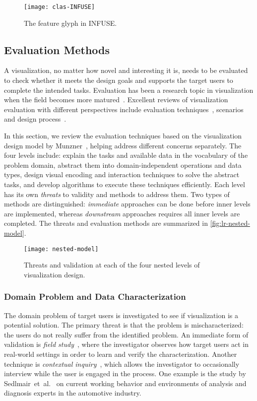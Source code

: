 \begin{figure}[!htb]
	\centering
	\texttt{[image: clas-INFUSE]}
	\caption{The feature glyph in INFUSE. }
	\label{fig:lr-INFUSE}
\end{figure}

\subsection{Evaluation Methods}
A visualization, no matter how novel and interesting it is, needs to be evaluated to check whether it meets the design goals and supports the target users to complete the intended tasks. Evaluation has been a research topic in visualization when the field becomes more matured~\cite{Plaisant2004}. Excellent reviews of visualization evaluation with different perspectives include evaluation techniques~\cite{Carpendale2008}, scenarios~\cite{Lam2012} and design process~\cite{Munroe2009}.

In this section, we review the evaluation techniques based on the visualization design model by Munzner~\cite{Munroe2009}, helping address different concerns separately. The four levels include: explain the tasks and available data in the vocabulary of the problem domain, abstract them into domain-independent operations and data types, design visual encoding and interaction techniques to solve the abstract tasks, and develop algorithms to execute these techniques efficiently. Each level has its own \emph{threats} to validity and methods to address them. Two types of methods are distinguished: \emph{immediate} approaches can be done before inner levels are implemented, whereas \emph{downstream} approaches requires all inner levels are completed. The threats and evaluation methods are summarized in \autoref{fig:lr-nested-model}.

\begin{figure}[!htb]
	\centering
	\texttt{[image: nested-model]}
	\caption{Threats and validation at each of the four nested levels of visualization design. }
	\label{fig:lr-nested-model}
\end{figure}

\subsubsection{Domain Problem and Data Characterization}
The domain problem of target users is investigated to see if visualization is a potential solution. The primary threat is that the problem is mischaracterized: the users do not really suffer from the identified problem. An immediate form of validation is \emph{field study}~\cite{Carpendale2008}, where the investigator observes how target users act in real-world settings in order to learn and verify the characterization. Another technique is \emph{contextual inquiry}~\cite{Holtzblatt1993}, which allows the investigator to occasionally interview while the user is engaged in the process. One example is the study by Sedlmair~et~al.~\cite{Sedlmair2008} on current working behavior and environments of analysis and diagnosis experts in the automotive industry.

